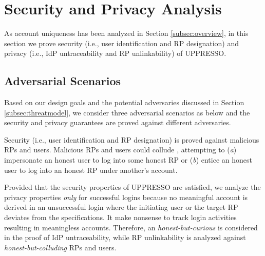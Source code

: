 \section{Security and Privacy Analysis}
\label{sec:analysis}

As account uniqueness has been analyzed in Section \ref{subsec:overview},
in this section we prove security (i.e., user identification and RP designation) and privacy (i.e., IdP untraceability and RP unlinkability) of UPPRESSO.


\subsection{Adversarial Scenarios}

Based on our design goals %
 and the potential adversaries discussed in Section \ref{subsec:threatmodel}, we consider three adversarial scenarios as below
 and the security and privacy guarantees are proved against different adversaries.


Security (i.e., user identification and RP designation) is proved against malicious RPs and users.
 Malicious RPs and users could collude \cite{FettKS14,BrowserID,SPRESSO},
  attempting to (\emph{a}) impersonate an honest user to log into some honest RP
   or (\emph{b}) entice an honest user to log into an honest RP under another's account.

Provided that the security properties of UPPRESSO are satisfied,
    we analyze the privacy properties \emph{only} for successful logins
    because no meaningful account is derived in an unsuccessful login
where the initiating user or the target RP deviates from the specifications.
It make nonsense to track login activities resulting in meaningless accounts.
Therefore,
    an \emph{honest-but-curious} is considered in the proof of IdP untraceability,
        while RP unlinkability is analyzed against \emph{honest-but-colluding} RPs and users.

%


